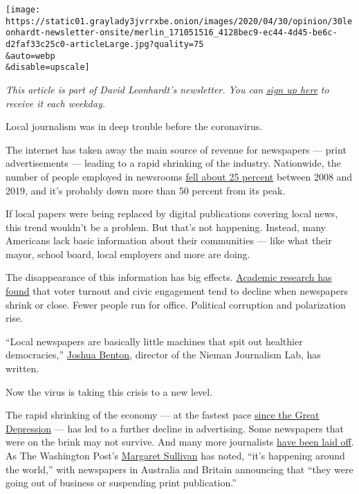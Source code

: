 \texttt{[image: https://static01.graylady3jvrrxbe.onion/images/2020/04/30/opinion/30leonhardt-newsletter-onsite/merlin\_171051516\_4128bec9-ec44-4d45-be6c-d2faf33c25c0-articleLarge.jpg?quality=75\\\&auto=webp\\\&disable=upscale]}

\emph{This article is part of David Leonhardt's newsletter. You can}
\href{https://www.nytimes3xbfgragh.onion/newsletters/opiniontoday?action=click\&module=Intentional\&pgtype=Article}{\emph{sign
up here}} \emph{to receive it each weekday.}

Local journalism was in deep trouble before the coronavirus.

The internet has taken away the main source of revenue for newspapers
--- print advertisements --- leading to a rapid shrinking of the
industry. Nationwide, the number of people employed in newsrooms
\href{https://www.pewresearch.org/fact-tank/2020/04/20/u-s-newsroom-employment-has-dropped-by-a-quarter-since-2008/}{fell
about 25 percent} between 2008 and 2019, and it's probably down more
than 50 percent from its peak.

If local papers were being replaced by digital publications covering
local news, this trend wouldn't be a problem. But that's not happening.
Instead, many Americans lack basic information about their communities
--- like what their mayor, school board, local employers and more are
doing.

The disappearance of this information has big effects.
\href{https://medium.com/office-of-citizen/how-we-know-journalism-is-good-for-democracy-9125e5c995fb}{Academic
research has found} that voter turnout and civic engagement tend to
decline when newspapers shrink or close. Fewer people run for office.
Political corruption and polarization rise.

``Local newspapers are basically little machines that spit out healthier
democracies,''
\href{https://www.niemanlab.org/2019/04/when-local-newspapers-shrink-fewer-people-bother-to-run-for-mayor/}{Joshua
Benton}, director of the Nieman Journalism Lab, has written.

Now the virus is taking this crisis to a new level.

The rapid shrinking of the economy --- at the fastest pace
\href{https://www.nytimes3xbfgragh.onion/2020/04/14/us/politics/coronavirus-economy-recession-depression.html}{since
the Great Depression} --- has led to a further decline in advertising.
Some newspapers that were on the brink may not survive. And many more
journalists
\href{https://www.nytimes3xbfgragh.onion/2020/04/10/business/media/news-media-coronavirus-jobs.html}{have
been laid off}. As The Washington Post's
\href{https://www.washingtonpost.com/lifestyle/media/local-journalism-needs-a-coronavirus-stimulus-plan-too/2020/03/25/08358062-6ec6-11ea-b148-e4ce3fbd85b5_story.html}{Margaret
Sullivan} has noted, ``it's happening around the world,'' with
newspapers in Australia and Britain announcing that ``they were going
out of business or suspending print publication.''

